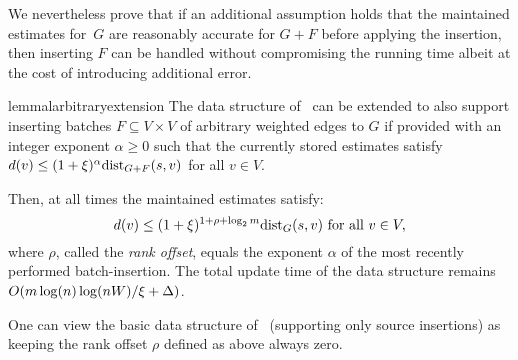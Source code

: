 \documentclass[11pt,letterpaper]{article}
\theoremstyle{plain}
\renewcommand{\O}{O}
\newcommand{\dist}{\mathrm{dist}}
\begin{document}
We nevertheless prove that if an additional assumption holds that
the maintained estimates for~$G$ are reasonably accurate for $G+F$ before applying the insertion,
then inserting $F$ can be handled without compromising the running time 
albeit at the cost of introducing additional error.
\newcommand{\roff}{\rho}
\begin{restatable}{lemma}{larbitraryextension}\label{l:arbitrary-extension}
The data structure of~ can be extended to also support
inserting batches $F\subseteq V\times V$ of arbitrary weighted edges to $G$ if provided with an integer exponent $\alpha\geq 0$ such that
the currently stored estimates satisfy
$d(v)\leq (1+\epsp)^{\alpha}\dist_{G+F}(s,v)$ for all $v\in V$.

Then, at all times the maintained estimates satisfy:
\[ d(v)\leq (1+\epsp)^{1+\roff+\log_2{m}} \dist_G(s,v)\text{ for all }v\in V, \]
where $\roff$, called the \emph{rank offset}, equals the exponent $\alpha$ of the most recently performed batch-insertion. The total
update time of the data structure remains $\O(m\log(n)\log(nW)/\epsp+\Delta)$.
\end{restatable}
One can view the basic data structure of~ (supporting only source insertions) as keeping the rank offset $\roff$ defined as above always zero.
\end{document}
